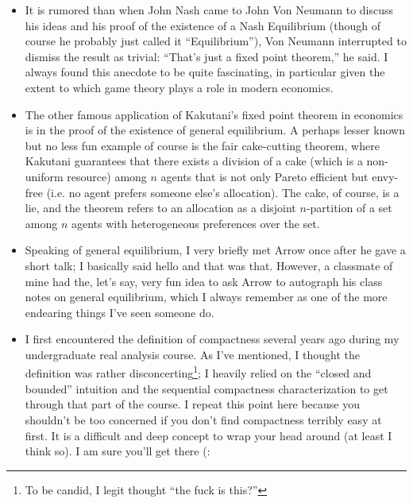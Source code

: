 \documentclass{article}
\theoremstyle{mythm}
\theoremstyle{mydef}
\begin{document}
\begin{itemize}
  \item It is rumored than when John Nash came to John Von Neumann to discuss his ideas and his proof of the existence of a Nash Equilibrium (though of course he probably just called it ``Equilibrium''), Von Neumann interrupted to dismiss the result as trivial: ``That's just a fixed point theorem,'' he said. I always found this anecdote to be quite fascinating, in particular given the extent to which game theory plays a role in modern economics.

  \item The other famous application of Kakutani's fixed point theorem in economics is in the proof of the existence of general equilibrium. A perhaps lesser known but no less fun example of course is the fair cake-cutting theorem, where Kakutani guarantees that there exists a division of a cake (which is a non-uniform resource) among $n$ agents that is not only Pareto efficient but envy-free (i.e. no agent prefers someone else's allocation). The cake, of course, is a lie, and the theorem refers to an allocation as a disjoint $n$-partition of a set among $n$ agents with heterogeneous preferences over the set.

  \item Speaking of general equilibrium, I very briefly met Arrow once after he gave a short talk; I basically said hello and that was that. However, a classmate of mine had the, let's say, very fun idea to ask Arrow to autograph his class notes on general equilibrium, which I always remember as one of the more endearing things I've seen someone do.

  \item I first encountered the definition of compactness several years ago during my undergraduate real analysis course. As I've mentioned, I thought the definition was rather disconcerting\footnote{To be candid, I legit thought ``the fuck is this?''}; I heavily relied on the ``closed and bounded'' intuition and the sequential compactness characterization to get through that part of the course. I repeat this point here because you shouldn't be too concerned if you don't find compactness terribly easy at first. It is a difficult and deep concept to wrap your head around (at least I think so). I am sure you'll get there (:
\end{itemize}

\clearpage
\appendix
\end{document}
